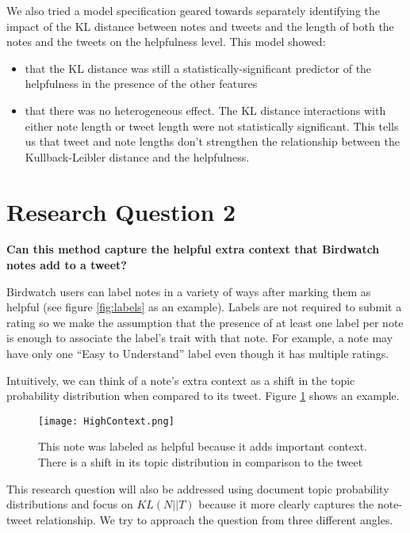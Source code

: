 \documentclass [11pt, proquest] {uwthesis}[2020/02/24]
\begin{document}
We also tried a model specification geared towards separately identifying the impact of the KL distance between notes and tweets and the length of both the notes and the tweets on the helpfulness level. This model showed:

\begin{itemize}
    \item that the KL distance was still a statistically-significant predictor of the helpfulness in the presence of the other features
    \item that there was no heterogeneous effect. The KL distance interactions with either note length or tweet length were not statistically significant. This tells us that tweet and note lengths don’t strengthen the relationship between the Kullback-Leibler distance and the helpfulness.

\end{itemize}

 \section{Research Question 2}\label{section:RQ2}

\textbf{Can this method capture the helpful extra context that Birdwatch notes add to a tweet?}

Birdwatch users can label notes in a variety of ways after marking them as helpful (see figure \ref{fig:labels} as an example). Labels are not required to submit a rating so we make the assumption that the presence of at least one label per note is enough to associate the label’s trait with that note. For example, a note may have only one “Easy to Understand” label even though it has multiple ratings.



Intuitively, we can think of a note's extra context as a shift in the topic probability distribution when compared to its tweet. Figure \ref{fig:highcontext} shows an example.

\begin{figure}[h]
\centering
\texttt{[image: HighContext.png]}
\caption{This note was labeled as helpful because it adds important context. There is a shift in its topic distribution in comparison to the tweet }
\label{fig:highcontext}
\end{figure}

This research question will also be addressed using document topic probability distributions and focus on $KL(N || T)$ because it more clearly captures the note-tweet relationship. We try to approach the question from three different angles.
\end{document}
